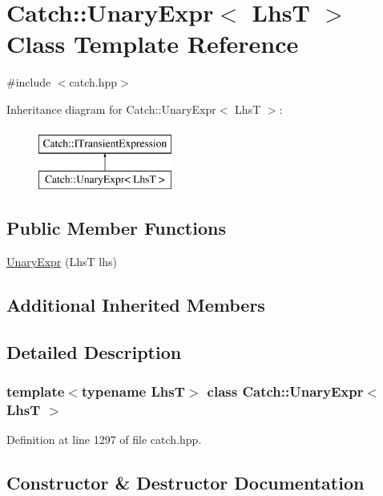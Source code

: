 \hypertarget{class_catch_1_1_unary_expr}{}\section{Catch\+:\+:Unary\+Expr$<$ LhsT $>$ Class Template Reference}
\label{class_catch_1_1_unary_expr}


{\ttfamily \#include $<$catch.\+hpp$>$}

Inheritance diagram for Catch\+:\+:Unary\+Expr$<$ LhsT $>$\+:\begin{figure}[H]
\begin{center}
\leavevmode
\includegraphics[height=2.000000cm]{class_catch_1_1_unary_expr}
\end{center}
\end{figure}
\subsection*{Public Member Functions}
\begin{DoxyCompactItemize}
\item 
\mbox{\hyperlink{class_catch_1_1_unary_expr_ae02f666a1e64da728628aa2033e1d6e7}{Unary\+Expr}} (LhsT lhs)
\end{DoxyCompactItemize}
\subsection*{Additional Inherited Members}


\subsection{Detailed Description}
\subsubsection*{template$<$typename LhsT$>$\newline
class Catch\+::\+Unary\+Expr$<$ Lhs\+T $>$}



Definition at line 1297 of file catch.\+hpp.



\subsection{Constructor \& Destructor Documentation}
\mbox{\label{class_catch_1_1_unary_expr_ae02f666a1e64da728628aa2033e1d6e7}} 
